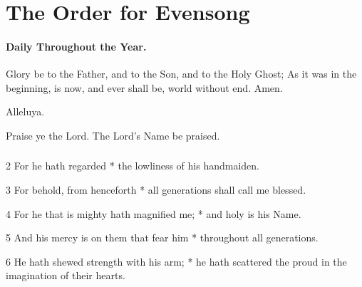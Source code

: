 \chapter{The Order for Evensong}
\subsubsection{Daily Throughout the Year.}
\bigskip
\ourFather

\medskip



\V Glory be to the Father, and to the Son, and to the Holy Ghost;  \R As it was in the beginning, is now, and ever shall be, world without end. Amen.

\centerline{Alleluya.}

{\centering{}\par}

\V Praise ye the Lord.  \R The Lord's Name be praised.

\bigskip


\subsection{}


2 For he hath regarded * the lowliness of his handmaiden.

3 For behold, from henceforth * all generations shall call me blessed.

4 For he that is mighty hath magnified me; * and holy is his Name.

5 And his mercy is on them that fear him * throughout all generations.

6 He hath shewed strength with his arm; * he hath scattered the proud in the imagination of their hearts.

